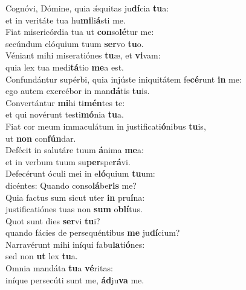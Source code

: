 \oddverse Cognóvi, Dómine, quia ǽquitas ju\textbf{dí}cia \textbf{tu}a:~\*\\
\oddverse et in veritáte tua hu\textbf{mi}li\textbf{á}sti me.\\
\evenverse Fiat misericórdia tua ut \textbf{con}so\textbf{lé}tur me:~\*\\
\evenverse secúndum elóquium tuum \textbf{ser}vo \textbf{tu}o.\\
\oddverse Véniant mihi miseratiónes \textbf{tu}æ, et \textbf{vi}vam:~\*\\
\oddverse quia lex tua medi\textbf{tá}tio \textbf{me}a est.\\
\evenverse Confundántur supérbi, quia injúste iniquitátem fe\textbf{cé}runt \textbf{in} me:~\*\\
\evenverse ego autem exercébor in man\textbf{dá}tis \textbf{tu}is.\\
\oddverse Convertántur \textbf{mi}hi ti\textbf{mén}tes te:~\*\\
\oddverse et qui novérunt testi\textbf{mó}nia \textbf{tu}a.\\
\evenverse Fiat cor meum immaculátum in justificati\textbf{ó}nibus \textbf{tu}is,~\*\\
\evenverse ut \textbf{non} con\textbf{fún}dar.\\
\oddverse Defécit in salutáre tuum \textbf{á}nima \textbf{me}a:~\*\\
\oddverse et in verbum tuum su\textbf{per}spe\textbf{rá}vi.\\
\evenverse Defecérunt óculi mei in e\textbf{ló}quium \textbf{tu}um:~\*\\
\evenverse dicéntes: Quando conso\textbf{lá}be\textbf{ris} me?\\
\oddverse Quia factus sum sicut uter \textbf{in} pru\textbf{í}na:~\*\\
\oddverse justificatiónes tuas non \textbf{sum} o\textbf{blí}tus.\\
\evenverse Quot sunt dies \textbf{ser}vi \textbf{tu}i?~\*\\
\evenverse quando fácies de persequéntibus \textbf{me} ju\textbf{dí}cium?\\
\oddverse Narravérunt mihi iníqui fabu\textbf{la}ti\textbf{ó}nes:~\*\\
\oddverse sed non \textbf{ut} lex \textbf{tu}a.\\
\evenverse Omnia mandáta \textbf{tu}a \textbf{vé}ritas:~\*\\
\evenverse iníque persecúti sunt me, \textbf{ád}ju\textbf{va} me.\\
